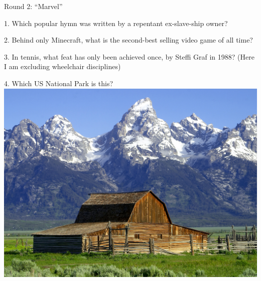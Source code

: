 \begin{frame}

\end{frame}
\begin{frame}
\begin{center}
\Huge
Round 2: ``Marvel''
\end{center}
\end{frame}
\begin{frame}
\begin{center}
\Large
1. Which popular hymn was written by a repentant ex-slave-ship owner?
\end{center}
\end{frame}
\begin{frame}
\begin{center}
\Large
2. Behind only Minecraft, what is the second-best selling video game of all time?
\end{center}
\end{frame}
\begin{frame}
\begin{center}
\Large
3. In tennis, what feat has only been achieved once, by Steffi Graf in 1988? (Here I am excluding wheelchair disciplines)
\end{center}
\end{frame}
\begin{frame}
\begin{center}
\Large
4. Which US National Park is this?
\\
\vspace{0.5em}\includegraphics[height=0.6\paperheight]{images/grand_tetons.jpg}
\end{center}
\end{frame}
